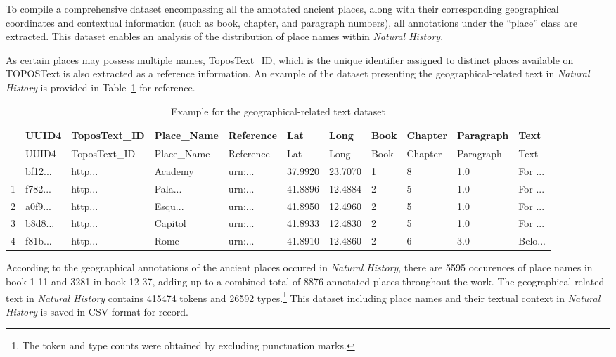 \documentclass[
  12pt,
]{article}
\begin{document}
To compile a comprehensive dataset encompassing all the annotated
ancient places, along with their corresponding geographical coordinates
and contextual information (such as book, chapter, and paragraph
numbers), all annotations under the ``place'' class are extracted. This
dataset enables an analysis of the distribution of place names within
\emph{Natural History}.

As certain places may possess multiple names, ToposText\_ID, which is
the unique identifier assigned to distinct places available on TOPOSText
is also extracted as a reference information. An example of the dataset
presenting the geographical-related text in \emph{Natural History} is
provided in Table~\ref{tbl-dataset_geotext} for reference.

\hypertarget{tbl-dataset_geotext}{}
\begin{longtable}[]{@{}lllllllllll@{}}
\caption{\label{tbl-dataset_geotext}Example for the geographical-related
text dataset}\tabularnewline
\toprule\noalign{}
& UUID4 & ToposText\_ID & Place\_Name & Reference & Lat & Long & Book &
Chapter & Paragraph & Text \\
\midrule\noalign{}
\endfirsthead
\toprule\noalign{}
& UUID4 & ToposText\_ID & Place\_Name & Reference & Lat & Long & Book &
Chapter & Paragraph & Text \\
\midrule\noalign{}
\endhead
\bottomrule\noalign{}
\endlastfoot
0 & bf12... & http... & Academy & urn:... & 37.9920 & 23.7070 & 1 & 8 &
1.0 & For ... \\
1 & f782... & http... & Pala... & urn:... & 41.8896 & 12.4884 & 2 & 5 &
1.0 & For ... \\
2 & a0f9... & http... & Esqu... & urn:... & 41.8950 & 12.4960 & 2 & 5 &
1.0 & For ... \\
3 & b8d8... & http... & Capitol & urn:... & 41.8933 & 12.4830 & 2 & 5 &
1.0 & For ... \\
4 & f81b... & http... & Rome & urn:... & 41.8910 & 12.4860 & 2 & 6 & 3.0
& Belo... \\
\end{longtable}

According to the geographical annotations of the ancient places occured
in \emph{Natural History}, there are 5595 occurences of place names in
book 1-11 and 3281 in book 12-37, adding up to a combined total of 8876
annotated places throughout the work. The geographical-related text in
\emph{Natural History} contains 415474 tokens and 26592
types.\footnote{The token and type counts were obtained by excluding
  punctuation marks.} This dataset including place names and their
textual context in \emph{Natural History} is saved in CSV format for
record.
\end{document}

